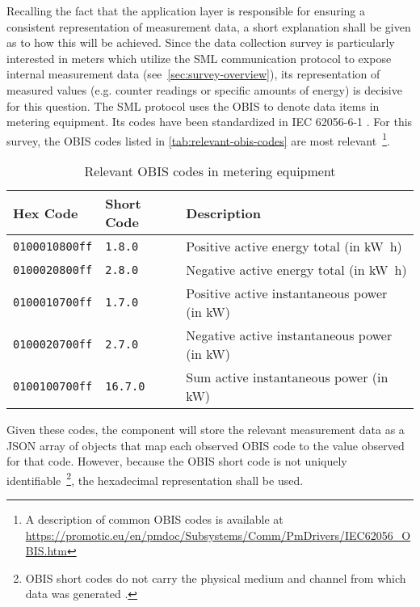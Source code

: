 Recalling the fact that the application layer is responsible for ensuring a consistent representation of measurement data, a short explanation shall be given as to how this will be achieved. Since the data collection survey is particularly interested in meters which utilize the \acf{SML} communication protocol to expose internal measurement data (see~\autoref{sec:survey-overview}), its representation of measured values (e.g. counter readings or specific amounts of energy) is decisive for this question. The \ac{SML} protocol uses the \ac{OBIS} to denote data items in metering equipment. Its codes have been standardized in \acs{IEC} 62056-6-1 \cite{iec2017obis}. For this survey, the \ac{OBIS} codes listed in \autoref{tab:relevant-obis-codes} are most relevant~\footnote{A description of common \acs{OBIS} codes is available at \url{https://promotic.eu/en/pmdoc/Subsystems/Comm/PmDrivers/IEC62056_OBIS.htm}}.

\begin{table}[hbt]
	\centering
  	\begin{tabularx}{\textwidth}{|l|l|X|}
		\hline
		\textbf{Hex Code} & \textbf{Short Code} & \textbf{Description} \\
	    \hline
	    \texttt{0100010800ff} & \texttt{1.8.0} & Positive active energy total (in \si{\kilo\watt\hour}) \\
	    	\texttt{0100020800ff} & \texttt{2.8.0} & Negative active energy total (in \si{\kilo\watt\hour}) \\
	    \texttt{0100010700ff} & \texttt{1.7.0} & Positive active instantaneous power (in \si{\kilo\watt}) \\
	    \texttt{0100020700ff} & \texttt{2.7.0} & Negative active instantaneous power (in \si{\kilo\watt}) \\
	    	\texttt{0100100700ff} & \texttt{16.7.0} & Sum active instantaneous power (in \si{\kilo\watt}) \\
	    	\hline
	\end{tabularx}
  	\caption{Relevant \acs*{OBIS} codes in metering equipment}
  	\label{tab:relevant-obis-codes}
\end{table}

\FloatBarrier

Given these codes, the component will store the relevant measurement data as a \acs{JSON} array of objects that map each observed \acs{OBIS} code to the value observed for that code. However, because the \acs{OBIS} short code is not uniquely identifiable~\footnote{\ac{OBIS} short codes do not carry the physical medium and channel from which data was generated \cite{iec2017obis}.}, the hexadecimal representation shall be used.


